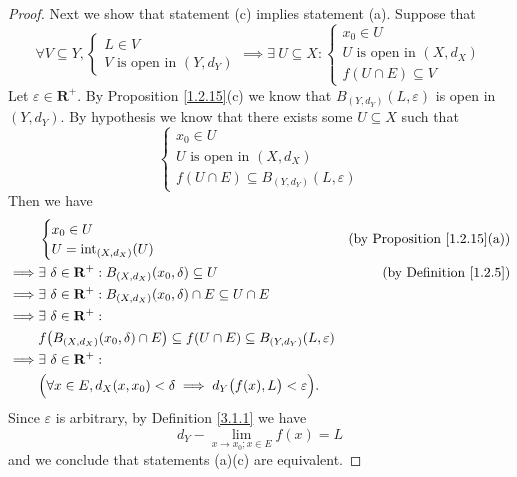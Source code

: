 \begin{proof}
    Next we show that statement (c) implies statement (a).
    Suppose that
    \[
        \forall V \subseteq Y, \begin{cases}
            L \in V \\
            V \text{ is open in } (Y, d_Y)
        \end{cases} \implies \exists\ U \subseteq X : \begin{cases}
            x_0 \in U                      \\
            U \text{ is open in } (X, d_X) \\
            f(U \cap E) \subseteq V
        \end{cases}
    \]
    Let \(\varepsilon \in \mathbf{R}^+\).
    By Proposition \ref{1.2.15}(c) we know that \(B_{(Y, d_Y)}(L, \varepsilon)\) is open in \((Y, d_Y)\).
    By hypothesis we know that there exists some \(U \subseteq X\) such that
    \[
        \begin{cases}
            x_0 \in U                      \\
            U \text{ is open in } (X, d_X) \\
            f(U \cap E) \subseteq B_{(Y, d_Y)}(L, \varepsilon)
        \end{cases}
    \]
    Then we have
    \begin{align*}
                 & \begin{cases}
                       x_0 \in U \\
                       U = \text{int}_{(X, d_X)}(U)
                   \end{cases}                                                                             & \text{(by Proposition \ref{1.2.15}(a))}             \\
        \implies & \exists\ \delta \in \mathbf{R}^+ : B_{(X, d_X)}(x_0, \delta) \subseteq U                                 & \text{(by Definition \ref{1.2.5})} \\
        \implies & \exists\ \delta \in \mathbf{R}^+ : B_{(X, d_X)}(x_0, \delta) \cap E \subseteq U \cap E                                                        \\
        \implies & \exists\ \delta \in \mathbf{R}^+ :                                                                                                            \\
                 & f\big(B_{(X, d_X)}(x_0, \delta) \cap E\big) \subseteq f(U \cap E) \subseteq B_{(Y, d_Y)}(L, \varepsilon)                                      \\
        \implies & \exists\ \delta \in \mathbf{R}^+ :                                                                                                            \\
                 & \Big(\forall x \in E, d_X(x, x_0) < \delta \implies d_Y\big(f(x), L\big) < \varepsilon\Big).
    \end{align*}
    Since \(\varepsilon\) is arbitrary, by Definition \ref{3.1.1} we have
    \[
        d_Y - \lim_{x \to x_0 ; x \in E} f(x) = L
    \]
    and we conclude that statements (a)(c) are equivalent.


\end{proof}
